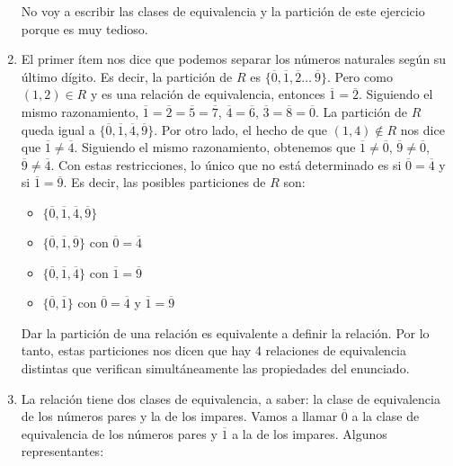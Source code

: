 \begin{enumerate}
  No voy a escribir las clases de equivalencia y la partición de este ejercicio porque es muy tedioso.
\item %
  El primer ítem nos dice que podemos separar los números naturales según su último dígito. Es decir, la partición de $R$ es $\{\overline{0}, \overline{1}, \overline{2}\ldots\ \overline{9}\}$.\newline
  Pero como $(1,2) \in R$ y es una relación de equivalencia, entonces $\overline{1} = \overline{2}$. Siguiendo el mismo razonamiento, $\overline{1} = \overline{2} = \overline{5} = \overline{7}$, $\overline{4} = \overline{6}$, $\overline{3} = \overline{8} = \overline{0}$. La partición de $R$ queda igual a $\{\overline{0},\overline{1},\overline{4},\overline{9}\}$.\newline
  Por otro lado, el hecho de que $(1,4) \notin R$ nos dice que $\overline{1} \neq \overline{4}$. Siguiendo el mismo razonamiento, obtenemos que $\overline{1} \neq \overline{0}$, $\overline{9} \neq \overline{0}$, $\overline{9} \neq \overline{4}$.\newline
  Con estas restricciones, lo único que no está determinado es si $\overline{0} = \overline{4}$ y si $\overline{1} = \overline{9}$. Es decir, las posibles particiones de $R$ son:
    \begin{multicols}{2}
    \begin{itemize}
    \item $\{\overline{0},\overline{1},\overline{4},\overline{9}\}$
    \item $\{\overline{0},\overline{1},\overline{9}\}$ con $\overline{0} = \overline{4}$
    \item $\{\overline{0},\overline{1},\overline{4}\}$ con $\overline{1} = \overline{9}$
    \item $\{\overline{0},\overline{1}\}$ con $\overline{0} = \overline{4}$ y $\overline{1} = \overline{9}$
    \end{itemize}
    \end{multicols}
  Dar la partición de una relación es equivalente a definir la relación. Por lo tanto, estas particiones nos dicen que hay 4 relaciones de equivalencia distintas que verifican simultáneamente las propiedades del enunciado.
\item %
  La relación tiene dos clases de equivalencia, a saber: la clase de equivalencia de los números pares y la de los impares. Vamos a llamar $\overline{0}$ a la clase de equivalencia de los números pares y $\overline{1}$ a la de los impares. Algunos representantes:
  \begin{multicols}{2}

\end{multicols}
\end{enumerate}
